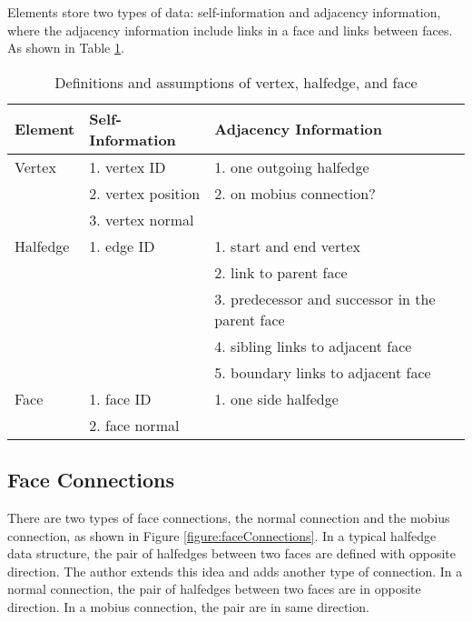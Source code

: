 \documentclass[12pt]{article}
\begin{document}
Elements store two types of data: self-information and adjacency information, where the adjacency information include links in a face and links between faces. As shown in Table \ref{table:vhfInfo}. 
\begin{table}[ht]
\centering
\begin{tabular}{| l | p{} | p{}|}

\hline
Element & Self-Information & Adjacency Information  \\
\hline
Vertex  & 1. vertex ID & 1. one outgoing halfedge   \\
& 2. vertex position & 2. on mobius connection? \\
& 3. vertex normal & \\
\hline
Halfedge & 1. edge ID & 1. start and end vertex\\
& & 2. link to parent face\\
& & 3. predecessor and successor in the parent face\\
& & 4. sibling links to adjacent face\\
& & 5. boundary links to adjacent face \\
\hline
Face    &  1. face ID & 1. one side halfedge\\
& 2. face normal &\\
\hline
\end{tabular}
\caption{Definitions and assumptions of vertex, halfedge, and face} 
\label{table:vhfInfo}
\end{table}

\subsection{Face Connections}

There are two types of face connections, the normal connection and the mobius connection, as shown in Figure \ref{figure:faceConnections}. In a typical halfedge data structure, the pair of halfedges between two faces are defined with opposite direction. The author extends this idea and adds another type of connection. In a normal connection, the pair of halfedges between two faces are in opposite direction. In a mobius connection, the pair are in same direction.
\end{document}
